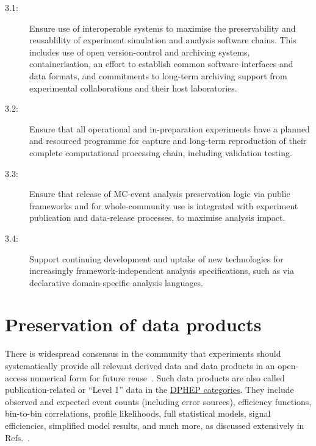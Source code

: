 \documentclass[11pt]{article}
\begin{document}
\begin{description}
   \item[3.1:] Ensure use of interoperable systems to maximise the preservability and reusablility of experiment simulation and analysis software chains. This includes use of open version-control and archiving systems, containerisation, an effort to establish common software interfaces and data formats, and commitments to long-term archiving support from experimental collaborations and their host laboratories.
   
   \item[3.2:] Ensure that all operational and in-preparation experiments have a planned and resourced programme for capture and long-term reproduction of their complete computational processing chain, including validation testing.
   
   \item[3.3:] Ensure that release of MC-event analysis preservation logic via public frameworks and for whole-community use is integrated with experiment publication and data-release processes, to maximise analysis impact.
   \item[3.4:] Support continuing development and uptake of new technologies for increasingly framework-independent analysis specifications, such as via declarative domain-specific analysis languages.
   
\end{description}

\section{Preservation of data products}
\label{data-products}

There is widespread consensus in the community that experiments should systematically provide all relevant derived data and data products in an open-access numerical form for future reuse~\cite{LHCReinterpretationForum:2020xtr}. 
Such data products are also called publication-related or ``Level 1'' data in the 
\href{https://opendata.cern.ch/docs/about}{DPHEP categories}. 
They include observed and expected event counts  (including error sources), efficiency functions,  bin-to-bin correlations, profile likelihoods, full statistical models, signal efficiencies, simplified model results, and much more, 
as discussed extensively in Refs.~\cite{LHCReinterpretationForum:2020xtr,Cranmer:2021urp}.
\end{document}
